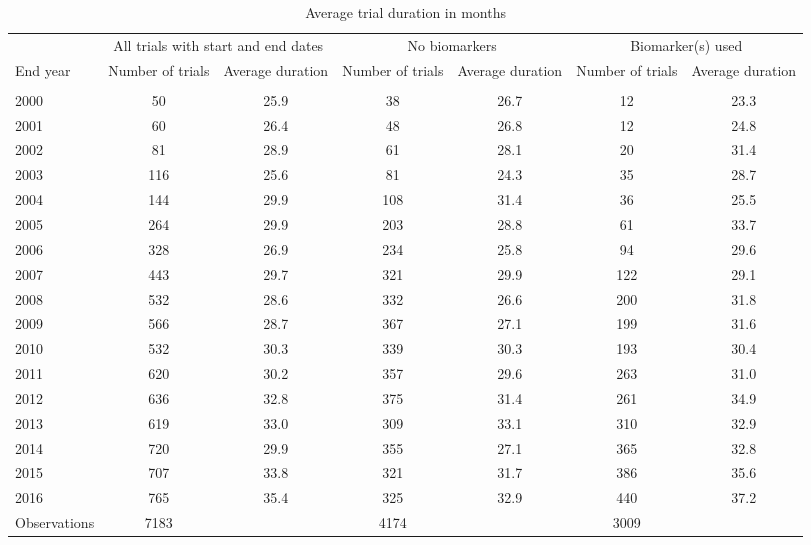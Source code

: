 \begin{table}[htbp]\centering
\caption{Average trial duration in months}
\begin{tabular}{l*{3}{cc}}
\hline\hline
                    &\multicolumn{2}{c}{All trials with start and end dates}&\multicolumn{2}{c}{No biomarkers}&\multicolumn{2}{c}{Biomarker(s) used}\\
End year            &Number of trials&Average duration&Number of trials&Average duration&Number of trials&Average duration\\
\hline
                    &            &            &            &            &            &            \\
2000                &          50&        25.9&          38&        26.7&          12&        23.3\\
2001                &          60&        26.4&          48&        26.8&          12&        24.8\\
2002                &          81&        28.9&          61&        28.1&          20&        31.4\\
2003                &         116&        25.6&          81&        24.3&          35&        28.7\\
2004                &         144&        29.9&         108&        31.4&          36&        25.5\\
2005                &         264&        29.9&         203&        28.8&          61&        33.7\\
2006                &         328&        26.9&         234&        25.8&          94&        29.6\\
2007                &         443&        29.7&         321&        29.9&         122&        29.1\\
2008                &         532&        28.6&         332&        26.6&         200&        31.8\\
2009                &         566&        28.7&         367&        27.1&         199&        31.6\\
2010                &         532&        30.3&         339&        30.3&         193&        30.4\\
2011                &         620&        30.2&         357&        29.6&         263&        31.0\\
2012                &         636&        32.8&         375&        31.4&         261&        34.9\\
2013                &         619&        33.0&         309&        33.1&         310&        32.9\\
2014                &         720&        29.9&         355&        27.1&         365&        32.8\\
2015                &         707&        33.8&         321&        31.7&         386&        35.6\\
2016                &         765&        35.4&         325&        32.9&         440&        37.2\\
\hline
Observations        &        7183&            &        4174&            &        3009&            \\
\hline\hline
\end{tabular}
\end{table}
